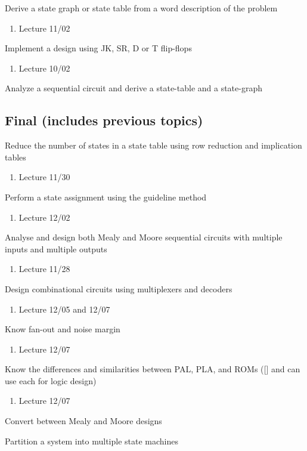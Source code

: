 \documentclass[options]{article}
\newcommand{\hilight}[1]{\setlength{\fboxsep}{1pt}\colorbox{red}{#1}}
\newcommand{\cmark}{\ding{51}}%
\newcommand{\xmark}{\ding{55}}%
\newcommand{\important}{\hilight{\rlap{$\square$}{\raisebox{2pt}{\large\hspace{1pt}\cmark}}}%
  \hspace{-2.5pt}}
\newcommand{\wontfix}{\rlap{$\square$}{\large\hspace{1pt}\xmark}}
\begin{document}
\begin{todolist}
\item[\important] Derive a state graph or state table from a word description of the problem
  \begin{enumerate}
  \item Lecture 11/02
  \end{enumerate}
\item[\important] Implement a design using JK, SR, D or T flip-flops
  \begin{enumerate}
  \item Lecture 10/02
  \end{enumerate}
\item[\wontfix] Analyze a sequential circuit and derive a state-table and a state-graph
\end{todolist}
\subsection{Final (includes previous topics)}
\begin{todolist}
  \item [\important] Reduce the number of states in a state table using row reduction and implication tables
    \begin{enumerate}
    \item Lecture 11/30
    \end{enumerate}
  \item [\important] Perform a state assignment using the guideline method
    \begin{enumerate}
    \item Lecture 12/02
    \end{enumerate}
  \item [\important] Analyse and design both Mealy and Moore sequential circuits with multiple inputs and multiple outputs
    \begin{enumerate}
    \item Lecture 11/28
    \end{enumerate}
  \item [\important] Design combinational circuits using multiplexers and decoders
    \begin{enumerate}
    \item Lecture 12/05 and 12/07
    \end{enumerate}
  \item [\important] Know fan-out and noise margin %
    \begin{enumerate}
    \item Lecture 12/07
    \end{enumerate}
  \item [\important] Know the differences and similarities between PAL, PLA, and ROMs
    ([\wontfix] and can use each for logic design)
    \begin{enumerate}
    \item Lecture 12/07
    \end{enumerate}
  \item [\wontfix] Convert between Mealy and Moore designs
  \item [\wontfix] Partition a system into multiple state machines
\end{todolist}
\end{document}
